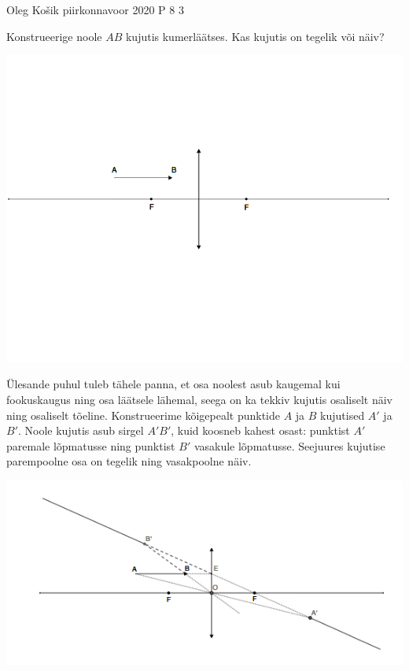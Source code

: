 {Oleg Košik} %
{piirkonnavoor} %
{2020} %
{P 8} %
{3} %
{
\ifStatement
Konstrueerige noole $AB$ kujutis kumerläätses. Kas kujutis on tegelik või näiv?
\begin{center}
	\includegraphics[width=0.5\linewidth]{2020-v2p-08-yl.PNG}
\end{center}
\fi
\ifHint
Ülesande puhul tuleb tähele panna, et osa noolest asub kaugemal kui fookuskaugus ning osa läätsele lähemal, seega on ka tekkiv kujutis osaliselt näiv ning osaliselt tõeline.
\fi
\ifSolution
Konstrueerime kõigepealt punktide $A$ ja $B$ kujutised $A'$ ja $B'$. Noole kujutis asub sirgel $A'B'$, kuid koosneb kahest osast: punktist $A'$ paremale lõpmatusse ning punktist $B'$ vasakule lõpmatusse. Seejuures kujutise parempoolne osa on tegelik ning vasakpoolne näiv.
\begin{center}
	\includegraphics[width=0.5\linewidth]{2020-v2p-08-lah.PNG}
\end{center}
\fi
}
